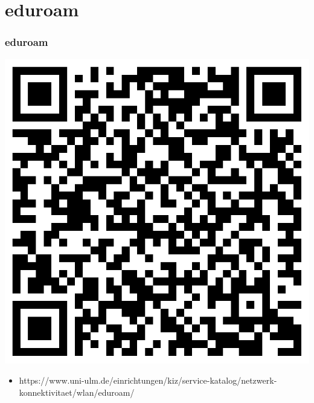 \documentclass[10pt,a4paper]{beamer}
\begin{document}
    \section{eduroam}
    \begin{frame}
        \frametitle{eduroam}
        \begin{center}
            \includegraphics[width=0.5\paperwidth]{eduroam.png}
        \end{center}
        \begin{itemize}
            \item https://www.uni-ulm.de/einrichtungen/kiz/service-katalog/netzwerk-konnektivitaet/wlan/eduroam/
        \end{itemize}
    \end{frame}
\end{document}
